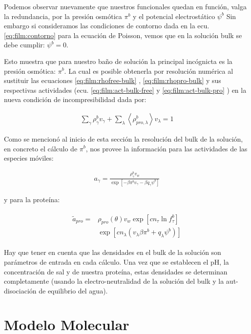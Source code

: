 Podemos observar nuevamente que nuestros funcionales quedan en funci\'on, valga la redundancia, por la presi\'on osm\'otica $\pi^b$ y el potencial electrost\'atico $\psi^b$
Sin embargo si consideramos las condiciones de contorno dada en la ecu. \ref{eq:film:contorno} para la ecuaci\'on de Poisson, vemos que en la soluci\'on bulk se debe cumplir: $\psi^b = 0$. 

Esto  muestra que para nuestro ba\~no de soluci\'on la principal inc\'ognicta es la presi\'on osm\'otica: $\pi^b$.
La cual es posible obtenerla por resoluci\'on num\'erica al sustituir las ecuaciones  \ref{eq:film:rhofree-bulk} ,  \ref{eq:film:rhopro-bulk}  y sus respectivas actividades (ecu. \ref{eq:film:act-bulk-free} y \ref{eq:film:act-bulk-pro} ) en la nueva condici\'on de incompresibilidad dada por:

\begin{align}
	\sum_\gamma \rho^b_\gamma v_\gamma + \sum_\lambda\left< \rho^b_{pro,\lambda}\right> v_\lambda = 1
	\label{eq:incom-bulk}
\end{align}

Como se mencion\'o al inicio de esta secci\'on la resoluci\'on del bulk de la soluci\'on, en concreto el c\'alculo de $\pi^b$, nos provee la informaci\'on para las actividades de las especies m\'oviles:

\begin{align}
	a_\gamma =\frac{\rho^b_\gamma v_w}{\exp\left[-\beta \pi^b v_\gamma - \beta q_\gamma\psi^b\right]}
	\label{eq:film:act-bulk-free}
\end{align}

 y para la prote\'ina:

\begin{align}
	\begin{aligned}
		\tilde{a}_{pro} = & \rho_{pro}(\theta)v_w\exp\left[cn_\tau \ln f^b_\tau\right] \\
		& \exp \left[cn_\lambda (v_\lambda\beta\pi^b + q_\lambda \psi^b) \right]
	\end{aligned}
\label{eq:film:act-bulk-pro}
\end{align}


Hay que tener en cuenta que las densidades en el bulk de la soluci\'on son par\'ametros de entrada en cada c\'alculo. Una vez que se establecen el pH, la concentraci\'on de sal y de nuestra prote\'ina, estas densidades se determinan completamente (usando la electro-neutralidad de la soluci\'on del bulk y la aut- disociaci\'on de equilibrio del agua).

\section{Modelo Molecular}

